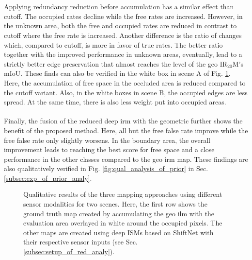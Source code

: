 \\\\
Applying redundancy reduction before accumulation has a similar effect than cutoff. The occupied rates decline while the free rates are increased. However, in the unknown area, both the free and occupied rates are reduced in contrast to cutoff where the free rate is increased. Another difference is the ratio of changes which, compared to cutoff, is more in favor of true rates. The better ratio together with the improved performance in unknown areas, eventually, lead to a strictly better edge preservation that almost reaches the level of the geo IR$_{20}$M's mIoU. These finds can also be verified in the white box in scene A of Fig. \ref{fig:qual_analysis_of_redundant_info}. Here, the accumulation of free space in the occluded area is reduced compared to the cutoff variant. Also, in the white boxes in scene B, the occupied edges are less spread. At the same time, there is also less weight put into occupied areas.
\\\\
Finally, the fusion of the reduced deep \gls{irm} with the geometric further shows the benefit of the proposed method. Here, all but the free false rate improve while the free false rate only slightly worsens. In the boundary area, the overall improvement leads to reaching the best score for free space and a close performance in the other classes compared to the geo \gls{irm} map. These findings are also qualitatively verified in Fig. \ref{fig:qual_analysis_of_prior} in Sec. \ref{subsec:exp_of_prior_analy}.
\begin{figure}[H]
	\begin{center}
		\caption{\label{fig:qual_analysis_of_redundant_info}Qualitative results of the three mapping approaches using different sensor modalities for two scenes. Here, the first row shows the ground truth map created by accumulating the geo \gls{ilm} with the evaluation area overlayed in white around the occupied pixels. The other maps are created using deep ISMs based on ShiftNet with their respective sensor inputs (see Sec. \ref{subsec:setup_of_red_analy}).}
	\end{center}
\end{figure}
